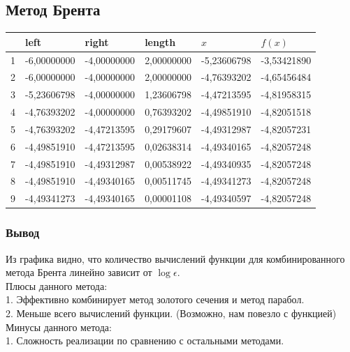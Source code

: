 \newpage

\subsection{Метод Брента}
\label{subsec:brentsection}
\begin{center}
    \begin{tabular}{ | l | l | l | l | l | l |}
        \hline
        \textnumero{} & left        & right       & length     & $x$         & $f(x)$      \\ \hline
        1             & -6,00000000 & -4,00000000 & 2,00000000 & -5,23606798 & -3,53421890 \\
        2             & -6,00000000 & -4,00000000 & 2,00000000 & -4,76393202 & -4,65456484 \\
        3             & -5,23606798 & -4,00000000 & 1,23606798 & -4,47213595 & -4,81958315 \\
        4             & -4,76393202 & -4,00000000 & 0,76393202 & -4,49851910 & -4,82051518 \\
        5             & -4,76393202 & -4,47213595 & 0,29179607 & -4,49312987 & -4,82057231 \\
        6             & -4,49851910 & -4,47213595 & 0,02638314 & -4,49340165 & -4,82057248 \\
        7             & -4,49851910 & -4,49312987 & 0,00538922 & -4,49340935 & -4,82057248 \\
        8             & -4,49851910 & -4,49340165 & 0,00511745 & -4,49341273 & -4,82057248 \\
        9             & -4,49341273 & -4,49340165 & 0,00001108 & -4,49340597 & -4,82057248 \\
        \hline
    \end{tabular}
\end{center}

\subsubsection{Вывод}
{Из графика  видно, что количество вычислений функции для комбинированного метода Брента линейно зависит от $\log\epsilon$. \\

Плюсы данного метода: \\
1. Эффективно комбинирует метод золотого сечения и метод парабол. \\
2. Меньше всего вычислений функции. (Возможно, нам повезло с функцией) \\

Минусы данного метода: \\
1. Сложность реализации по сравнению с остальными методами.}


